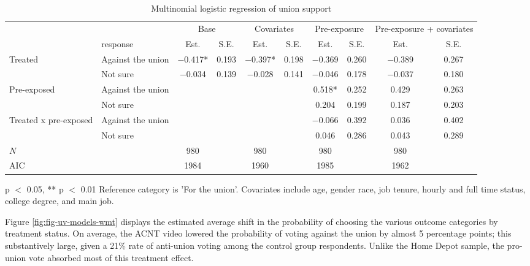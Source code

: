 \documentclass[
  11pt,
  oneside]{article}
\begin{document}
\begin{table}
\centering
\caption{\label{tab:tab-uv-models-wmt}Multinomial logistic regression of union support \label{tab:tab-uv-models-wmt}}
\centering
\begin{threeparttable}
\begin{tabular}[t]{llcccccccc}
\toprule
\multicolumn{2}{c}{ } & \multicolumn{2}{c}{Base} & \multicolumn{2}{c}{Covariates} & \multicolumn{2}{c}{Pre-exposure} & \multicolumn{2}{c}{Pre-exposure +
 covariates} \\
\cmidrule(l{3pt}r{3pt}){3-4} \cmidrule(l{3pt}r{3pt}){5-6} \cmidrule(l{3pt}r{3pt}){7-8} \cmidrule(l{3pt}r{3pt}){9-10}
  & response & Est. & S.E. & Est. & S.E. & Est. & S.E. & Est. & S.E.\\
\midrule
Treated & Against the union & \num{-0.417}* & \num{0.193} & \num{-0.397}* & \num{0.198} & \num{-0.369} & \num{0.260} & \num{-0.389} & \num{0.267}\\
 & Not sure & \num{-0.034} & \num{0.139} & \num{-0.028} & \num{0.141} & \num{-0.046} & \num{0.178} & \num{-0.037} & \num{0.180}\\
Pre-exposed & Against the union &  &  &  &  & \num{0.518}* & \num{0.252} & \num{0.429} & \num{0.263}\\
 & Not sure &  &  &  &  & \num{0.204} & \num{0.199} & \num{0.187} & \num{0.203}\\
Treated x pre-exposed & Against the union &  &  &  &  & \num{-0.066} & \num{0.392} & \num{0.036} & \num{0.402}\\
 & Not sure &  &  &  &  & \num{0.046} & \num{0.286} & \num{0.043} & \num{0.289}\\
\midrule
$N$ &  & \num{980} &  & \num{980} &  & \num{980} &  & \num{980} & \\
AIC &  & \num{1984} &  & \num{1960} &  & \num{1985} &  & \num{1962} & \\
\bottomrule
\end{tabular}
\begin{tablenotes}
\item * p $<$ 0.05, ** p $<$ 0.01 Reference category is 'For the union'. Covariates include age, gender race, job tenure, hourly and full time status, college degree, and main job.
\end{tablenotes}
\end{threeparttable}
\end{table}

Figure \ref{fig:fig-uv-models-wmt} displays the estimated average shift in the probability of choosing the various outcome categories by treatment status. On average, the ACNT video lowered the probability of voting against the union by almost 5 percentage points; this substantively large, given a 21\% rate of anti-union voting among the control group respondents. Unlike the Home Depot sample, the pro-union vote absorbed most of this treatment effect.
\end{document}
